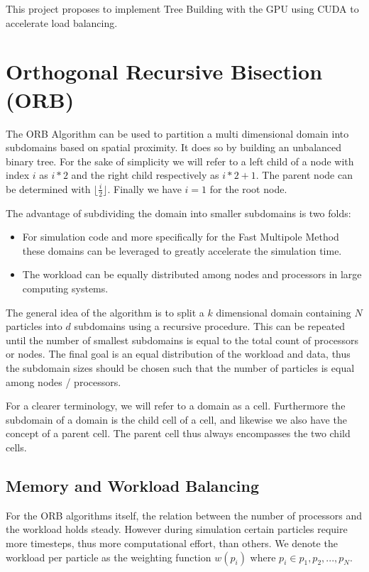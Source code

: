 \documentclass[]{article}
\begin{document}
This project proposes to implement Tree Building with the GPU using CUDA to accelerate load balancing.


\section{Orthogonal Recursive Bisection (ORB)}


The ORB Algorithm can be used to partition a multi dimensional domain into subdomains based on spatial proximity. It does so by building an unbalanced binary tree. For the sake of simplicity we will refer to a left child of a node with index $i$ as $i*2$ and the right child respectively as $i*2 + 1$. The parent node can be determined with $\lfloor \frac{i}{2} \rfloor$. Finally we have $i = 1$ for the root node.

The advantage of subdividing the domain into smaller subdomains is two folds:

\begin{itemize}
	\item For simulation code and more specifically for the Fast Multipole Method these domains can be leveraged to greatly accelerate the simulation time. 
	\item The workload can be equally distributed among nodes and processors in large computing systems.
\end{itemize} 


The general idea of the algorithm is to split a $k$ dimensional domain containing $N$ particles into $d$ subdomains using a recursive procedure. This can be repeated until the number of smallest subdomains is equal to the total count of processors or nodes. The final goal is an equal distribution of the workload and data, thus the subdomain sizes should be chosen such that the number of particles is equal among nodes / processors.

For a clearer terminology, we will refer to a domain as a cell. Furthermore the subdomain of a domain is the child cell of a cell, and likewise we also have the concept of a parent cell. The parent cell thus always encompasses the two child cells.

\subsection{Memory and Workload Balancing}\label{sec:balancing}
For the ORB algorithms itself, the relation between the number of processors and the workload holds steady. However during simulation certain particles require more timesteps, thus more computational effort, than others. We denote the workload per particle as the weighting function $w(p_i)$ where $p_i \in {p_1, p_2, ..., p_N}$.
\end{document}
